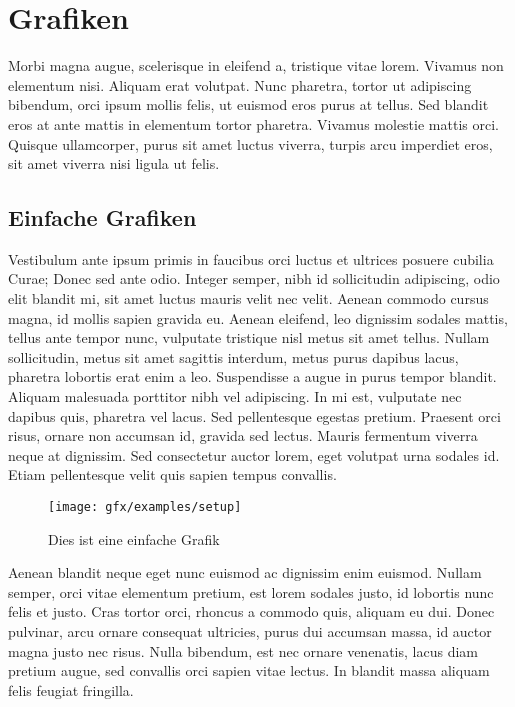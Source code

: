 %
%
\section{Grafiken}\label{sec:grafiken}
Morbi magna augue, scelerisque in eleifend a, tristique vitae lorem. Vivamus non elementum nisi. Aliquam erat volutpat. Nunc pharetra, tortor ut adipiscing bibendum, orci ipsum mollis felis, ut euismod eros purus at tellus. Sed blandit eros at ante mattis in elementum tortor pharetra. Vivamus molestie mattis orci. Quisque ullamcorper, purus sit amet luctus viverra, turpis arcu imperdiet eros, sit amet viverra nisi ligula ut felis.

\subsection{Einfache Grafiken}\label{ssec:einfache-grafiken}
Vestibulum ante ipsum primis in faucibus orci luctus et ultrices posuere cubilia Curae; Donec sed ante odio. Integer semper, nibh id sollicitudin adipiscing, odio elit blandit mi, sit amet luctus mauris velit nec velit. Aenean commodo cursus magna, id mollis sapien gravida eu. Aenean eleifend, leo dignissim sodales mattis, tellus ante tempor nunc, vulputate tristique nisl metus sit amet tellus. Nullam sollicitudin, metus sit amet sagittis interdum, metus purus dapibus lacus, pharetra lobortis erat enim a leo. Suspendisse a augue in purus tempor blandit. Aliquam malesuada porttitor nibh vel adipiscing. In mi est, vulputate nec dapibus quis, pharetra vel lacus. Sed pellentesque egestas pretium. Praesent orci risus, ornare non accumsan id, gravida sed lectus. Mauris fermentum viverra neque at dignissim. Sed consectetur auctor lorem, eget volutpat urna sodales id. Etiam pellentesque velit quis sapien tempus convallis.

\begin{figure}[htbp]
 \centering
 \texttt{[image: gfx/examples/setup]}
 \caption{Dies ist eine einfache Grafik}
 \label{fig:chapter03:setup}
\end{figure}

Aenean blandit neque eget nunc euismod ac dignissim enim euismod. Nullam semper, orci vitae elementum pretium, est lorem sodales justo, id lobortis nunc felis et justo. Cras tortor orci, rhoncus a commodo quis, aliquam eu dui. Donec pulvinar, arcu ornare consequat ultricies, purus dui accumsan massa, id auctor magna justo nec risus. Nulla bibendum, est nec ornare venenatis, lacus diam pretium augue, sed convallis orci sapien vitae lectus. In blandit massa aliquam felis feugiat fringilla.

